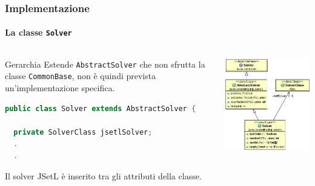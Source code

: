\documentclass{beamer}
\begin{document}
\begin{frame}[fragile]
\frametitle{Implementazione}
\framesubtitle{La classe \texttt{Solver}}
\begin{columns}
\begin{column}{0.55\textwidth}
\begin{block}{Gerarchia}
Estende \texttt{AbstractSolver} che non sfrutta la classe \texttt{CommonBase},
non è quindi prevista un'implementazione
specifica.
\begin{lstlisting}[language = Java, linewidth = 170pt]
public class Solver extends AbstractSolver {

  private SolverClass jsetlSolver;
  .
  .
\end{lstlisting}
Il solver JSetL è inserito tra gli attributi della classe.
\end{block}
\end{column}
\begin{column}{0.4\textwidth}
\begin{flushleft}
\includegraphics[scale=0.45]{../relazione/img/Solver1.JPG}
\end{flushleft}
\end{column}
\end{columns}
\end{frame}
\end{document}
